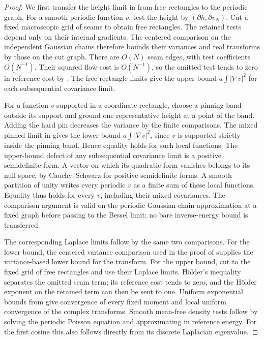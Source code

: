 \begin{proof}
We first transfer the height limit in
\cite[Theorem 2.4]{X} from free rectangles to
the periodic graph.  For a smooth periodic function $v$, test the
height by $(\partial h,\partial v_N)$.  Cut a fixed macroscopic
grid of seams to obtain free rectangles.  The retained tests depend
only on their internal gradients.  The centered comparison on the
independent Gaussian chains therefore bounds their variances and
real transforms by those on the cut graph.  There are $O(N)$ seam
edges, with test coefficients $O(N^{-1})$.  Their squared flow
cost is $O(N^{-1})$, so the omitted test tends to zero in reference
cost by \cite[Lemma 2.3]{X}.  The free
rectangle limits give the upper bound
$a\int|\nabla v|^2$ for each subsequential covariance limit.

For a function $v$ supported in a coordinate rectangle, choose a
pinning band outside its support and ground one representative
height at a point of the band.  Adding the hard pin decreases the
variance by the finite comparisons.  The mixed pinned limit in
\cite[Theorem 3.1]{X} gives the lower bound
$a\int|\nabla v|^2$, since $v$ is supported strictly inside the
pinning band.  Hence equality holds for such local functions.
The upper-bound defect of any subsequential covariance limit is
a positive semidefinite form.  A vector on which its quadratic
form vanishes belongs to its null space, by Cauchy--Schwarz for
positive semidefinite forms.  A smooth partition of unity writes
every periodic $v$ as a finite sum of these local functions.
Equality thus holds for every $v$, including their mixed
covariances.  The comparison argument is valid on the periodic
Gaussian-chain approximation at a fixed graph before passing to
the Bessel limit; no bare inverse-energy bound is transferred.

The corresponding Laplace limits follow by the same two comparisons.
For the lower bound, the centered variance comparison used in the
proof of \cite[Theorem 2.4]{X} supplies the
variance-based lower bound for the transform.  For the upper bound,
cut to the fixed grid of free rectangles and use their Laplace
limits.  H\"older's inequality separates the omitted seam term;
its reference cost tends to zero, and the H\"older exponent on
the retained term can then be sent to one.  Uniform exponential
bounds from \cite[Lemma 2.3]{X} give
convergence of every fixed moment and local uniform convergence
of the complex transforms.  Smooth mean-free density tests follow
by solving the periodic Poisson equation and approximating in
reference energy.  For the first cosine this also follows directly
from its discrete Laplacian eigenvalue.


\end{proof}
